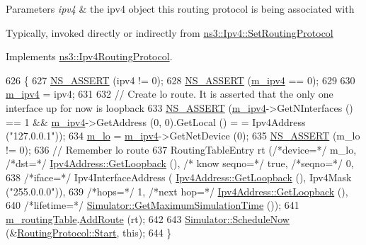 \begin{DoxyParams}{Parameters}
{\em ipv4} & the ipv4 object this routing protocol is being associated with\\
\hline
\end{DoxyParams}
Typically, invoked directly or indirectly from \hyperlink{classns3_1_1Ipv4_a2d165c3bafd4ca580f02a03536db80d3}{ns3\+::\+Ipv4\+::\+Set\+Routing\+Protocol} 

Implements \hyperlink{classns3_1_1Ipv4RoutingProtocol_af3947a05b912ea3f2a1ef0e9777f723e}{ns3\+::\+Ipv4\+Routing\+Protocol}.


\begin{DoxyCode}
626 \{
627   \hyperlink{assert_8h_a6dccdb0de9b252f60088ce281c49d052}{NS\_ASSERT} (ipv4 != 0);
628   \hyperlink{assert_8h_a6dccdb0de9b252f60088ce281c49d052}{NS\_ASSERT} (\hyperlink{classns3_1_1aodv_1_1RoutingProtocol_aee33006b1f9d8b24d4722037ff3fec98}{m\_ipv4} == 0);
629 
630   \hyperlink{classns3_1_1aodv_1_1RoutingProtocol_aee33006b1f9d8b24d4722037ff3fec98}{m\_ipv4} = ipv4;
631 
632   \textcolor{comment}{// Create lo route. It is asserted that the only one interface up for now is loopback}
633   \hyperlink{assert_8h_a6dccdb0de9b252f60088ce281c49d052}{NS\_ASSERT} (\hyperlink{classns3_1_1aodv_1_1RoutingProtocol_aee33006b1f9d8b24d4722037ff3fec98}{m\_ipv4}->GetNInterfaces () == 1 && \hyperlink{classns3_1_1aodv_1_1RoutingProtocol_aee33006b1f9d8b24d4722037ff3fec98}{m\_ipv4}->GetAddress (0, 0).GetLocal () =
      = Ipv4Address (\textcolor{stringliteral}{"127.0.0.1"}));
634   \hyperlink{classns3_1_1aodv_1_1RoutingProtocol_a55d7e550c45e7a211ba8781f1b5b0015}{m\_lo} = \hyperlink{classns3_1_1aodv_1_1RoutingProtocol_aee33006b1f9d8b24d4722037ff3fec98}{m\_ipv4}->GetNetDevice (0);
635   \hyperlink{assert_8h_a6dccdb0de9b252f60088ce281c49d052}{NS\_ASSERT} (m\_lo != 0);
636   \textcolor{comment}{// Remember lo route}
637   RoutingTableEntry rt (\textcolor{comment}{/*device=*/} m\_lo, \textcolor{comment}{/*dst=*/} \hyperlink{classns3_1_1Ipv4Address_a583a93499e0d947439794d7bd0c6366d}{Ipv4Address::GetLoopback} (), \textcolor{comment}{/*
      know seqno=*/} \textcolor{keyword}{true}, \textcolor{comment}{/*seqno=*/} 0,
638                                     \textcolor{comment}{/*iface=*/} Ipv4InterfaceAddress (
      \hyperlink{classns3_1_1Ipv4Address_a583a93499e0d947439794d7bd0c6366d}{Ipv4Address::GetLoopback} (), Ipv4Mask (\textcolor{stringliteral}{"255.0.0.0"})),
639                                     \textcolor{comment}{/*hops=*/} 1, \textcolor{comment}{/*next hop=*/} 
      \hyperlink{classns3_1_1Ipv4Address_a583a93499e0d947439794d7bd0c6366d}{Ipv4Address::GetLoopback} (),
640                                     \textcolor{comment}{/*lifetime=*/} 
      \hyperlink{classns3_1_1Simulator_aa8dbab888dca7bf3528421d2c5e67f99}{Simulator::GetMaximumSimulationTime} ());
641   \hyperlink{classns3_1_1aodv_1_1RoutingProtocol_a4e1003a34c8adc96db71096d88c98ae0}{m\_routingTable}.\hyperlink{classns3_1_1aodv_1_1RoutingTable_a579e562e38e67d510de1ff2c87806c76}{AddRoute} (rt);
642 
643   \hyperlink{classns3_1_1Simulator_a2219ee02c0647adc83d1c918c3256266}{Simulator::ScheduleNow} (&\hyperlink{classns3_1_1aodv_1_1RoutingProtocol_a93dd1a9a127ebea592e06e3cf3f5cb11}{RoutingProtocol::Start}, \textcolor{keyword}{this});
644 \}
\end{DoxyCode}


